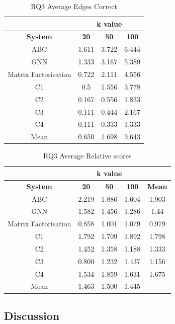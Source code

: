 \documentclass{l4proj}
\begin{document}
\begin{table}[h]
    \centering
    \caption{RQ3 Average Edges Correct}
    \label{tab:rq3_correct}
    \begin{tabular}{|c|c|c|c|}
    \hline
    & \multicolumn{3}{|c|}{k value} \\ \hline
    \textbf{System} & \textbf{20} & \textbf{50} & \textbf{100}\\ \hline
    ABC & 1.611 & 3.722 & 6.444 \\ \hline
    GNN & 1.333 & 3.167 & 5.389 \\ \hline
    Matrix Factorisation & 0.722 & 2.111 & 4.556 \\ \hline
    C1 & 0.5 & 1.556 & 3.778 \\ \hline
    C2 & 0.167 & 0.556 & 1.833 \\ \hline
    C3 & 0.111 & 0.444 & 2.167 \\ \hline
    C4 & 0.111 & 0.333 & 1.333 \\ \hline
    Mean & 0.650 & 1.698 & 3.643 \\ \hline
    \end{tabular}
\end{table}

\begin{table}[h]
    \centering
    \caption{RQ3 Average Relative scores}
    \label{tab:rq3_score}
    \begin{tabular}{|c|c|c|c|c|}
    \hline
    & \multicolumn{3}{|c|}{k value} & \\ \hline
    \textbf{System} & \textbf{20} & \textbf{50} & \textbf{100} & \textbf{Mean}\\ \hline
    ABC & 2.219 & 1.886 & 1.604 & 1.903\\ \hline
    GNN & 1.582 & 1.456 & 1.286 & 1.44\\ \hline
    Matrix Factorisation & 0.858 & 1.001 & 1.079 & 0.979\\ \hline
    C1 & 1.792 & 1.709 & 1.892 & 1.798\\ \hline
    C2 & 1.452 & 1.358 & 1.188 & 1.333\\ \hline
    C3 & 0.800 & 1.232 & 1.437 & 1.156\\ \hline
    C4 & 1.534 & 1.859 & 1.631 & 1.675\\ \hline
    Mean & 1.463 & 1.500 & 1.445 & \\ \hline
    \end{tabular}
\end{table}

\subsection{Discussion}
\end{document}
